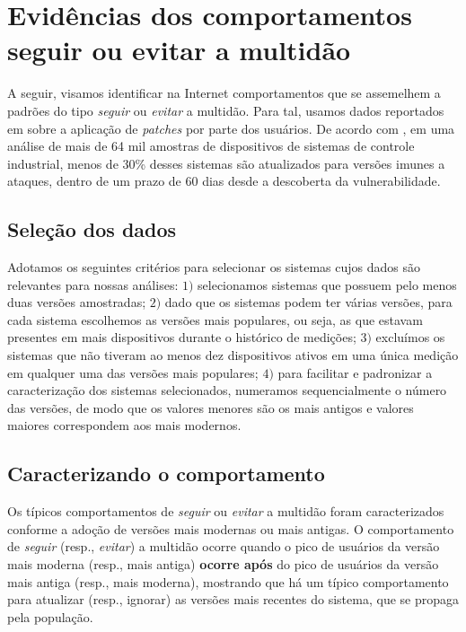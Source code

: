 
\chapter{Evidências dos comportamentos seguir ou evitar a multidão }
\label{cap:evidencias}


	A seguir,  visamos identificar na Internet comportamentos que se assemelhem a padrões do tipo   \textit{seguir} ou \textit{evitar} a multidão.
Para tal,	usamos dados reportados em \cite{wang2017characterizing} sobre a aplicação de \emph{patches} por parte dos usuários.    
	De acordo com \cite{wang2017characterizing}, em uma análise de mais de 64 mil amostras de dispositivos  de sistemas de controle industrial, menos de 30\% desses sistemas são atualizados para versões imunes a ataques, dentro de um prazo de 60 dias desde a descoberta da vulnerabilidade.   
	
		
	\section{Seleção dos dados}
	Adotamos os seguintes critérios para selecionar os sistemas cujos dados são  relevantes para nossas análises: $1)$ selecionamos sistemas que possuem pelo menos duas versões amostradas; $2)$ dado que os sistemas podem ter várias versões, para cada sistema escolhemos as versões mais populares, ou seja, as que estavam presentes em mais dispositivos durante o  histórico de medições; $3)$  excluímos os sistemas que não tiveram ao menos dez dispositivos ativos em uma única medição em qualquer uma das versões mais populares; $4)$ para facilitar e padronizar a caracterização dos sistemas selecionados, numeramos sequencialmente o número das versões, de modo que os valores menores são os mais antigos e valores maiores correspondem aos mais modernos.
	
	\section{Caracterizando o comportamento} Os típicos comportamentos de \textit{seguir} ou \textit{evitar} a multidão foram caracterizados conforme a adoção de versões mais modernas ou mais antigas. O comportamento de \textit{seguir} (resp., \textit{evitar}) a multidão ocorre quando o pico de usuários da versão mais moderna (resp., mais antiga)  \textbf{ocorre após} do pico de usuários da versão mais antiga (resp., mais moderna), mostrando que há um típico comportamento para atualizar (resp., ignorar) as versões mais recentes do sistema, que se propaga pela população.


